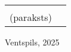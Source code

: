 \begin{titlepage}
\begin{center}
\begin{tabular}{@{}r@{}l@{}}
{%

\mbox{}\hrulefill\vspace{-0.4em}\\
{\scriptsize(paraksts)}\vspace{2em}} \\
\end{tabular}
\vfill
Ventspils, 2025
\end{center}
\end{titlepage}